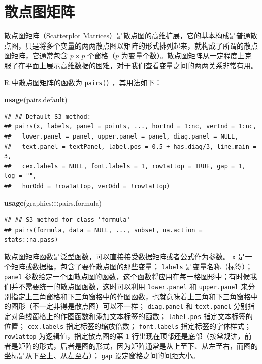 \documentclass[
  b5paper,
  UTF8,twoside]{book}
\newenvironment{Shaded}{\begin{snugshade}}{\end{snugshade}}
\newcommand{\FunctionTok}[1]{\textcolor[rgb]{0.13,0.29,0.53}{\textbf{#1}}}
\newcommand{\NormalTok}[1]{#1}
\newcommand{\SpecialCharTok}[1]{\textcolor[rgb]{0.81,0.36,0.00}{\textbf{#1}}}
\begin{document}
\section{散点图矩阵}\label{sec:scatterplot-matrix}

散点图矩阵（Scatterplot Matrices）是散点图的高维扩展，它的基本构成是普通散点图，只是将多个变量的两两散点图以矩阵的形式排列起来，就构成了所谓的散点图矩阵，它通常包含 \(p\times p\) 个窗格（\(p\) 为变量个数）。散点图矩阵从一定程度上克服了在平面上展示高维数据的困难，对于我们查看变量之间的两两关系非常有用。

R 中散点图矩阵的函数为 \texttt{pairs()} ，其用法如下：

\begin{Shaded}
\begin{Highlighting}[]
\FunctionTok{usage}\NormalTok{(pairs.default)}
\end{Highlighting}
\end{Shaded}

\begin{verbatim}
## ## Default S3 method:
## pairs(x, labels, panel = points, ..., horInd = 1:nc, verInd = 1:nc,
##   lower.panel = panel, upper.panel = panel, diag.panel = NULL,
##   text.panel = textPanel, label.pos = 0.5 + has.diag/3, line.main = 3,
##   cex.labels = NULL, font.labels = 1, row1attop = TRUE, gap = 1, log = "",
##   horOdd = !row1attop, verOdd = !row1attop)
\end{verbatim}

\begin{Shaded}
\begin{Highlighting}[]
\FunctionTok{usage}\NormalTok{(graphics}\SpecialCharTok{:::}\NormalTok{pairs.formula)}
\end{Highlighting}
\end{Shaded}

\begin{verbatim}
## ## S3 method for class 'formula'
## pairs(formula, data = NULL, ..., subset, na.action = stats::na.pass)
\end{verbatim}

散点图矩阵函数是泛型函数，可以直接接受数据矩阵或者公式作为参数。 \texttt{x} 是一个矩阵或数据框，包含了要作散点图的那些变量； \texttt{labels} 是变量名称（标签）； \texttt{panel} 参数给定一个画散点图的函数，这个函数将应用在每一格图形中；有时候我们并不需要统一的散点图函数，这时可以利用 \texttt{lower.panel} 和 \texttt{upper.panel} 来分别指定上三角窗格和下三角窗格中的作图函数，也就意味着上三角和下三角窗格中的图形（不一定非得是散点图）可以不一样； \texttt{diag.panel} 和 \texttt{text.panel} 分别指定对角线窗格上的作图函数和添加文本标签的函数； \texttt{label.pos} 指定文本标签的位置； \texttt{cex.labels} 指定标签的缩放倍数； \texttt{font.labels} 指定标签的字体样式； \texttt{row1attop} 为逻辑值，指定散点图的第 1 行出现在顶部还是底部（按常规讲，前者是矩阵的形式，后者是图的形式，因为矩阵通常是从上至下、从左至右，而图的坐标是从下至上、从左至右）； \texttt{gap} 设定窗格之间的间距大小。
\end{document}
